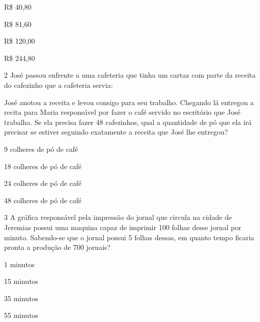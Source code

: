\begin{escolha}
\item
  R\$ 40,80
\item
  R\$ 81,60
\item
  R\$ 120,00
\item
  R\$ 244,80
\end{escolha}


\num{2} José passou enfrente a uma cafeteria que tinha um cartaz com parte
da receita do cafezinho que a cafeteria servia:


José anotou a receita e levou consigo para seu trabalho. Chegando lá
entregou a recita para Maria responsável por fazer o café servido no
escritório que José trabalha. Se ela precisa fazer 48 cafezinhos, qual a
quantidade de pó que ela irá precisar se estiver seguindo exatamente a
receita que José lhe entregou?

\begin{escolha}
\item
  9 colheres de pó de café
\item
  18 colheres de pó de café
\item
  24 colheres de pó de café
\item
  48 colheres de pó de café
\end{escolha}


\num{3} A gráfica responsável pela impressão do jornal que circula na
cidade de Jeremias possui uma maquina capaz de imprimir 100 folhas desse
jornal por minuto. Sabendo-se que o jornal possui 5 folhas dessas, em
quanto tempo ficaria pronta a produção de 700 jornais?

\begin{escolha}
\item
  1 minutos
\item
  15 minutos
\item
  35 minutos
\item
  55 minutos
\end{escolha}

